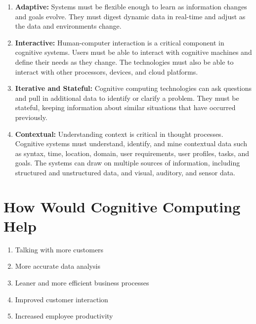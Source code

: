 \documentclass{article}
\begin{document}
\begin{enumerate}
	\item \textbf{Adaptive:} Systems must be flexible enough to learn as information changes and goals evolve. They must digest dynamic data in real-time and adjust as the data and environments change.
	\item \textbf{Interactive:} Human-computer interaction is a critical component in cognitive systems. Users must be able to interact with cognitive machines and define their needs as they change. The technologies must also be able to interact with other processors, devices, and cloud platforms.
	\item \textbf{Iterative and Stateful:} Cognitive computing technologies can ask questions and pull in additional data to identify or clarify a problem. They must be stateful, keeping information about similar situations that have occurred previously.
	\item \textbf{Contextual:} Understanding context is critical in thought processes. Cognitive systems must understand, identify, and mine contextual data such as syntax, time, location, domain, user requirements, user profiles, tasks, and goals. The systems can draw on multiple sources of information, including structured and unstructured data, and visual, auditory, and sensor data.\cite{context}
\end{enumerate}

\section{How Would Cognitive Computing Help}
\begin{enumerate}
	\item Talking with more customers
	\item More accurate data analysis
	\item Leaner and more efficient business processes
	\item Improved customer interaction
	\item Increased employee productivity
\end{enumerate}

\break


\end{document}
